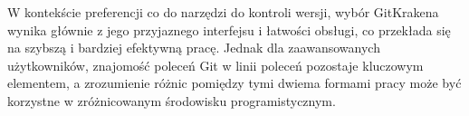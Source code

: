 \documentclass[a4paper,12pt]{article}
\begin{document}
W kontekście preferencji co do narzędzi do kontroli wersji, wybór GitKrakena wynika głównie z jego przyjaznego interfejsu i łatwości obsługi, co przekłada się na szybszą i bardziej efektywną pracę. Jednak dla zaawansowanych użytkowników, znajomość poleceń Git w linii poleceń pozostaje kluczowym elementem, a zrozumienie różnic pomiędzy tymi dwiema formami pracy może być korzystne w zróżnicowanym środowisku programistycznym.

\printbibliography[
    heading=bibintoc,
    title={Bibliografia}
]
\nocite{*}
\end{document}
